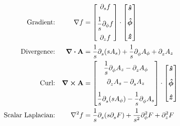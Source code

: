         \begin{align*}
        \text{Gradient:}&&%
            \nabla f &= 
            \qty[
            \begin{matrix}
                \mathlarger{\partial_{s}f}
                \\[0.3 cm]
                \mathlarger{\frac{1}{s} \partial_{\phi}f}
                \\[0.3 cm]
                \mathlarger{\partial_{z}f}
            \end{matrix}]
            \cdot
            \qty[
            \begin{matrix}
                \e{s}
                \\[0.3 cm]
                \e{\phi}
                \\[0.3 cm]
                \e{z}
            \end{matrix}]
            \\
        \text{Divergence:}&&%
            \div\vb{A} &= \oo{s}\pder*{s}\qty(s A_s) + \oo{s}\pder*{\phi}A_\phi  + \pder*{z}A_z
            \\
        \text{Curl:}&&%
            \curl \vb{A} &= 
            \qty[ 
            \begin{matrix}
                \mathlarger{\oo{s} \pder*{\phi}A_z - \pder*{z}A_\phi} 
                \\[0.3 cm]
                \mathlarger{\pder*{z}A_s - \pder*{s}A_z}
                \\[0.3 cm]
                \mathlarger{\oo{s}\pder*{s}\qty(s A_\phi) - \oo{s}\pder*{\phi}A_s}
            \end{matrix}]
            \cdot\qty[
            \begin{matrix}
                \e{s}
                \\[0.3 cm]
                \e{\phi}
                \\[0.3 cm]
                \e{z}
            \end{matrix}]
            \\
            \text{Scalar Laplacian:}&&%
            \nabla^2 f
            &=\oo{s}\pder*{s}\qty(s\pder*{s}F) + \oo{{s}^2}\pder*[2]{\phi}F+ \pder*[2]{z}F 
        \end{align*}
        \length
%